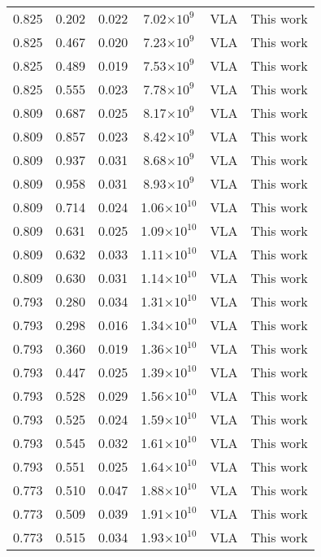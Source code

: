\documentclass{aa}
\begin{document}
{\begin{longtable}{c|c|c|c|c|c}
  0.825 &   0.202   &  0.022 &  7.02$\times 10^{9}$  &  VLA & This work \\
  0.825 &   0.467   &  0.020 &  7.23$\times 10^{9}$  &  VLA & This work \\
  0.825 &   0.489   &  0.019 &  7.53$\times 10^{9}$  &  VLA & This work \\
  0.825 &   0.555   &  0.023 &  7.78$\times 10^{9}$  &  VLA & This work \\
  0.809 &   0.687   &  0.025 &  8.17$\times 10^{9}$  &  VLA & This work \\
  0.809 &   0.857   &  0.023 &  8.42$\times 10^{9}$  &  VLA & This work \\
  0.809 &   0.937   &  0.031 &  8.68$\times 10^{9}$  &  VLA & This work \\
  0.809 &   0.958   &  0.031 &  8.93$\times 10^{9}$  &  VLA & This work \\
  0.809 &   0.714   &  0.024 &  1.06$\times 10^{10}$ &  VLA & This work \\
  0.809 &   0.631   &  0.025 &  1.09$\times 10^{10}$ &  VLA & This work \\
  0.809 &   0.632   &  0.033 &  1.11$\times 10^{10}$ &  VLA & This work \\
  0.809 &   0.630   &  0.031 &  1.14$\times 10^{10}$ &  VLA & This work \\
  0.793 &   0.280   &  0.034 &  1.31$\times 10^{10}$ &  VLA & This work \\
  0.793 &   0.298   &  0.016 &  1.34$\times 10^{10}$ &  VLA & This work \\
  0.793 &   0.360   &  0.019 &  1.36$\times 10^{10}$ &  VLA & This work \\
  0.793 &   0.447   &  0.025 &  1.39$\times 10^{10}$ &  VLA & This work \\
  0.793 &   0.528   &  0.029 &  1.56$\times 10^{10}$ &  VLA & This work \\
  0.793 &   0.525   &  0.024 &  1.59$\times 10^{10}$ &  VLA & This work \\
  0.793 &   0.545   &  0.032 &  1.61$\times 10^{10}$ &  VLA & This work \\
  0.793 &   0.551   &  0.025 &  1.64$\times 10^{10}$ &  VLA & This work \\
  0.773 &   0.510   &  0.047 &  1.88$\times 10^{10}$ &  VLA & This work \\
  0.773 &   0.509   &  0.039 &  1.91$\times 10^{10}$ &  VLA & This work \\
  0.773 &   0.515   &  0.034 &  1.93$\times 10^{10}$ &  VLA & This work \\

\end{longtable}}
\end{document}
